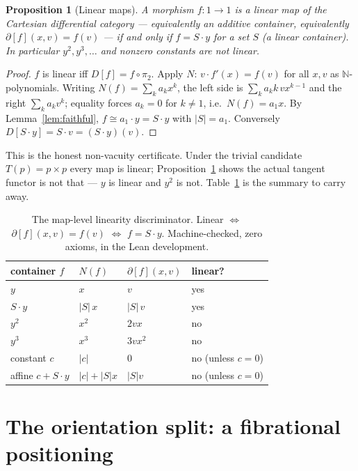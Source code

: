 \documentclass[11pt]{article}
\newtheorem{proposition}[theorem]{Proposition}
\theoremstyle{definition}
\newcommand{\N}{\mathbb{N}}
\begin{document}
\begin{proposition}[Linear maps]\label{prop:linear}
A morphism $f\colon1\to1$ is a linear map of the Cartesian differential category --- equivalently an
additive container, equivalently $\partial[f](x,v)=f(v)$ --- if and only if $f=S\cdot y$ for a set $S$
(a linear container). In particular $y^2,y^3,\dots$ and nonzero constants are \emph{not} linear.
\end{proposition}

\begin{proof}
$f$ is linear iff $D[f]=f\circ\pi_2$. Apply $N$: $v\cdot f'(x)=f(v)$ for all $x,v$ as
$\N$-polynomials. Writing $N(f)=\sum_k a_k x^k$, the left side is $\sum_k a_k k\,v x^{k-1}$ and the
right $\sum_k a_k v^k$; equality forces $a_k=0$ for $k\neq1$, i.e.\ $N(f)=a_1 x$. By
Lemma~\ref{lem:faithful}, $f\cong a_1\cdot y=S\cdot y$ with $|S|=a_1$. Conversely
$D[S\cdot y]=S\cdot v=(S\cdot y)(v)$.
\end{proof}

This is the honest non-vacuity certificate. Under the trivial candidate $T(p)=p\times p$ every map is
linear; Proposition~\ref{prop:linear} shows the actual tangent functor is not that --- $y$ is linear
and $y^2$ is not. Table~\ref{tab:linear} is the summary to carry away.

\begin{table}[h]
\centering
\begin{tabular}{llll}
\toprule
container $f$ & $N(f)$ & $\partial[f](x,v)$ & linear? \\
\midrule
$y$        & $x$     & $v$          & yes \\
$S\cdot y$ & $|S|\,x$ & $|S|\,v$     & yes \\
$y^2$      & $x^2$   & $2vx$        & no \\
$y^3$      & $x^3$   & $3vx^2$      & no \\
constant $c$ & $|c|$ & $0$          & no (unless $c=0$) \\
affine $c+ S\cdot y$ & $|c|+|S|x$ & $|S|v$ & no (unless $c=0$) \\
\bottomrule
\end{tabular}
\caption{The map-level linearity discriminator. Linear $\iff$ $\partial[f](x,v)=f(v)$ $\iff$
$f=S\cdot y$. Machine-checked, zero axioms, in the Lean development.}
\label{tab:linear}
\end{table}

\section{The orientation split: a fibrational positioning}\label{sec:orientation}
\end{document}
